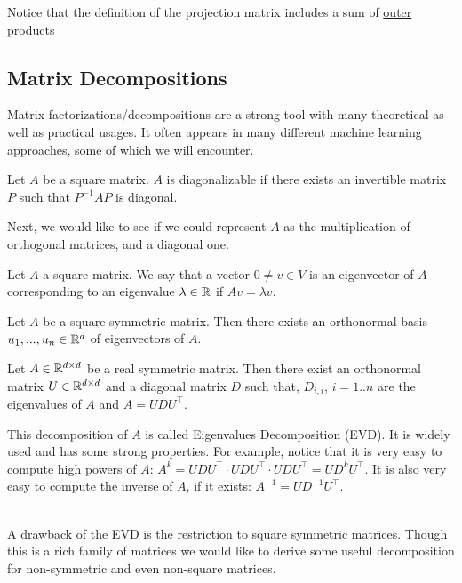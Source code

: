 \begin{remark}
Notice that the definition of the projection matrix includes a sum of \href{https://en.wikipedia.org/wiki/Outer_product}{outer products}
\end{remark}


\subsection{Matrix Decompositions}
Matrix factorizations/decompositions are a strong tool with many theoretical as well as practical usages. It often appears in many different machine learning approaches, some of which we will encounter.

\begin{definition}
Let $A$ be a square matrix. $A$ is diagonalizable if there exists an invertible matrix $P$ such that $P^{-1}AP$ is diagonal.
\end{definition}

Next, we would like to see if we could represent $A$ as the multiplication of orthogonal matrices, and a diagonal one.

\begin{definition}
Let $A$ a square matrix. We say that a vector $0\neq v\in V$ is an eigenvector of $A$ corresponding to an eigenvalue $\lambda\in\mathbb{R}$ if $Av=\lambda v$.
\end{definition}

\begin{claim}
Let $A$ be a square symmetric matrix. Then there exists an orthonormal basis $u_1,...,u_n\in\mathbb{R}^d$ of eigenvectors of $A$.
\end{claim}

\begin{theorem}[EVD]
Let $A\in \mathbb{R}^{d\times d}$ be a real symmetric matrix. Then there exist an orthonormal matrix $U\in \mathbb{R}^{d\times d}$ and a diagonal matrix $D$ such that, $D_{i,i}$, $i=1..n$ are the eigenvalues of $A$ and $A=UDU^\top$.
\end{theorem}

This decomposition of $A$ is called Eigenvalues Decomposition (EVD). It is widely used and has some strong properties. For example, notice that it is very easy to compute high powers of $A$: $A^k=UDU^\top\cdot UDU^\top\cdot UDU^\top=UD^kU^\top$. It is also very easy to compute the inverse of $A$, if it exists: $A^{-1}=UD^{-1}U^\top$. 

~\\A drawback of the EVD is the restriction to square symmetric matrices. Though this is a rich family of matrices we would like to derive some useful decomposition for non-symmetric and even non-square matrices.

